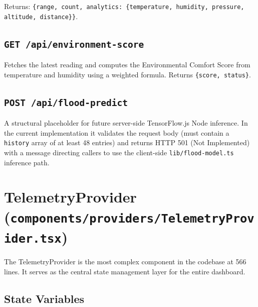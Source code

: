 Returns: \texttt{\{range,\allowbreak{} count,\allowbreak{} analytics: \{temperature,\allowbreak{} humidity,\allowbreak{} pressure,\allowbreak{} altitude,\allowbreak{} distance\}\}}.

\subsection{\texttt{GET /\allowbreak{}api/\allowbreak{}environment-score}}

Fetches the latest reading and computes the Environmental Comfort Score from temperature and humidity using a weighted formula. Returns \texttt{\{score,\allowbreak{} status\}}.

\subsection{\texttt{POST /\allowbreak{}api/\allowbreak{}flood-predict}}

A structural placeholder for future server-side TensorFlow.js Node inference. In the current implementation it validates the request body (must contain a \texttt{history} array of at least 48 entries) and returns HTTP 501 (Not Implemented) with a message directing callers to use the client-side \texttt{lib/\allowbreak{}flood-model.\allowbreak{}ts} inference path.

\section{TelemetryProvider (\texttt{components/\allowbreak{}providers/\allowbreak{}TelemetryProvider.\allowbreak{}tsx})}

The TelemetryProvider is the most complex component in the codebase at 566 lines. It serves as the central state management layer for the entire dashboard.

\subsection{State Variables}

